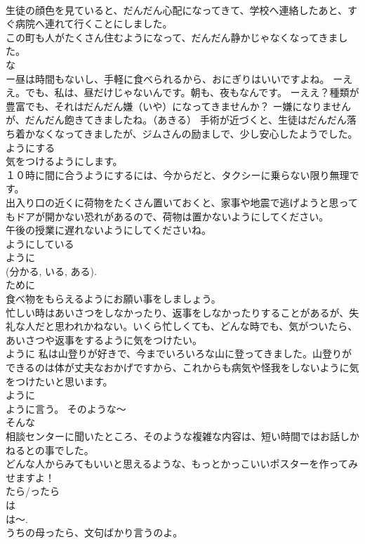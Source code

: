 \documentclass[8pt]{extreport}
\begin{document}
\begin{CJK}{UTF8}{min}
\\	生徒の顔色を見ていると、だんだん心配になってきて、学校へ連絡したあと、すぐ病院へ連れて行くことにしました。　
\\	この町も人がたくさん住むようになって、だんだん静かじゃなくなってきました。 
\\	な
\\	ー昼は時間もないし、手軽に食べられるから、おにぎりはいいですよね。 ーええ。でも、私は、昼だけじゃないんです。朝も、夜もなんです。 ーええ？種類が豊富でも、それはだんだん嫌（いや）になってきませんか？ ー嫌になりませんが、だんだん飽きてきましたね。（あきる） 手術が近づくと、生徒はだんだん落ち着かなくなってきましたが、ジムさんの励ましで、少し安心したようでした。 ようにする 
\\	気をつけるようにします。 
\\	１０時に間に合うようにするには、今からだと、タクシーに乗らない限り無理です。
\\	出入り口の近くに荷物をたくさん置いておくと、家事や地震で逃げようと思ってもドアが開かない恐れがあるので、荷物は置かないようにしてください。 
\\	午後の授業に遅れないようにしてくださいね。 
\\	ようにしている 
\\	ように
\\	(分かる, いる, ある). 
\\	ために 
\\	食べ物をもらえるようにお願い事をしましょう。 
\\	忙しい時はあいさつをしなかったり、返事をしなかったりすることがあるが、失礼な人だと思われかねない。いくら忙しくても、どんな時でも、気がついたら、あいさつや返事をするように気をつけたい。 
\\	ように 私は山登りが好きで、今までいろいろな山に登ってきました。山登りができるのは体が丈夫なおかげですから、これからも病気や怪我をしないように気をつけたいと思います。 
\\	ように
\\	ように言う。 そのような～ 
\\	そんな
\\	相談センターに聞いたところ、そのような複雑な内容は、短い時間ではお話しかねるとの事でした。 
\\	どんな人からみてもいいと思えるような、もっとかっこいいポスターを作ってみせますよ！ 
\\	たら/ったら	
\\	は 
\\	は～. 
\\	うちの母ったら、文句ばかり言うのよ。 

\end{CJK}
\end{document}
